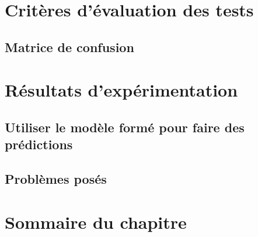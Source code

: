 	\section{Critères d'évaluation des tests}
	\lipsum[1] 
	\subsection{Matrice de confusion}
	\lipsum[1] 
	\section{Résultats d'expérimentation}
	\subsection{Utiliser le modèle formé pour faire des prédictions}
	\lipsum[1] 
	\subsection{Problèmes posés}
	\lipsum[1] 
	\section{Sommaire du chapitre}
	\lipsum[1] 
	\lipsum[1] 
	\lipsum[1] 
	

